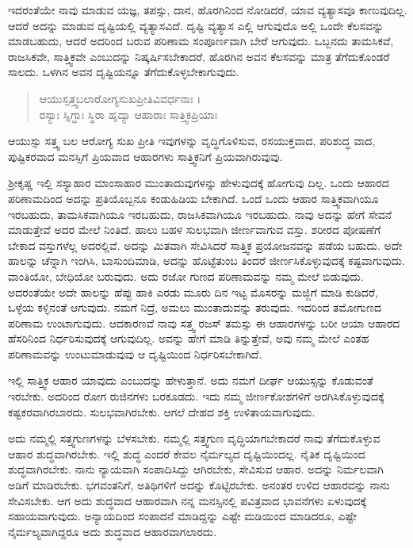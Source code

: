 ಇದರಂತೆಯೇ ನಾವು ಮಾಡುವ ಯಜ್ಞ, ತಪಸ್ಸು, ದಾನ, ಹೊರಗಿನಿಂದ ನೋಡಿದರೆ, ಯಾವ ವ್ಯತ್ಯಾಸವೂ ಕಾಣುವುದಿಲ್ಲ. ಆದರೆ ಅದನ್ನು ಮಾಡುವ ದೃಷ್ಟಿಯಲ್ಲಿ ವ್ಯತ್ಯಾಸವಿದೆ. ದೃಷ್ಟಿ ವ್ಯತ್ಯಾಸ ಎಲ್ಲಿ ಆಗುವುದೊ ಅಲ್ಲಿ ಒಂದೇ ಕೆಲಸವನ್ನು ಮಾಡಬಹುದು, ಆದರೆ ಅದರಿಂದ ಬರುವ ಪರಿಣಾಮ ಸಂಪೂರ್ಣವಾಗಿ ಬೇರೆ ಆಗುವುದು. ಒಬ್ಬನದು ತಾಮಸಿಕವೆ, ರಾಜಸಿಕವೇ, ಸಾತ್ತ್ವಿಕವೇ ಎಂಬುದನ್ನು ನಿಷ್ಕರ್ಷಿಸಬೇಕಾದರೆ, ಹೊರಗಿನ ಅವನ ಕೆಲಸವನ್ನು ಮಾತ್ರ ತೆಗೆದುಕೊಂಡರೆ ಸಾಲದು. ಒಳಗಿನ ಅವನ ದೃಷ್ಟಿಯನ್ನೂ ತೆಗೆದುಕೊಳ್ಳಬೇಕಾಗುವುದು.

\begin{verse}
ಆಯುಸ್ಸತ್ತ್ವಬಲಾರೋಗ್ಯಸುಖಪ್ರೀತಿವಿವರ್ಧನಾಃ ।\\ರಸ್ಯಾಃ ಸ್ನಿಗ್ಧಾಃ ಸ್ಥಿರಾ ಹೃದ್ಯಾ ಆಹಾರಾಃ ಸಾತ್ತ್ವಿಕಪ್ರಿಯಾಃ 
\end{verse}

{\small ಆಯುಸ್ಸು ಸತ್ತ್ವ ಬಲ ಆರೋಗ್ಯ ಸುಖ ಪ್ರೀತಿ ಇವುಗಳನ್ನು ವೃದ್ಧಿಗೊಳಿಸುವ, ರಸಯುಕ್ತವಾದ, ಪರಿಶುದ್ಧ ವಾದ, ಪುಷ್ಟಿಕರವಾದ ಮನಸ್ಸಿಗೆ ಪ್ರಿಯವಾದ ಆಹಾರಗಳು ಸಾತ್ತ್ವಿಕನಿಗೆ ಪ್ರಿಯವಾಗಿರುವುವು.}

ಶ್ರೀಕೃಷ್ಣ ಇಲ್ಲಿ ಸಸ್ಯಾಹಾರ ಮಾಂಸಾಹಾರ ಮುಂತಾದುವುಗಳನ್ನು ಹೇಳುವುದಕ್ಕೆ ಹೋಗುವು ದಿಲ್ಲ. ಒಂದು ಆಹಾರದ ಪರಿಣಾಮದಿಂದ ಅದನ್ನು ಪ್ರತಿಯೊಬ್ಬನೂ ಕಂಡುಹಿಡಿಯ ಬೇಕಾಗಿದೆ. ಒಂದೆ ಒಂದು ಆಹಾರ ಸಾತ್ತ್ವಿಕವಾಗಿಯೂ ಇರಬಹುದು, ತಾಮಸಿಕವಾಗಿಯೂ ಇರಬಹುದು, ರಾಜಸಿಕವಾಗಿಯೂ ಇರಬಹುದು. ನಾವು ಅದನ್ನು ಹೇಗೆ ಸೇವನೆ ಮಾಡುತ್ತೇವೆ ಅದರ ಮೇಲೆ ನಿಂತಿದೆ. ಹಾಲು ಬಹಳ ಸುಲಭವಾಗಿ ಜೀರ್ಣವಾಗುವ ವಸ್ತು. ಶರೀರದ ಪೋಷಣೆಗೆ ಬೇಕಾದ ವಸ್ತುಗಳೆಲ್ಲ ಅದರಲ್ಲಿವೆ. ಅದನ್ನು ಮಿತವಾಗಿ ಸೇವಿಸಿದರೆ ಸಾತ್ತ್ವಿಕ ಪ್ರಯೋಜನವನ್ನು ಪಡೆಯ ಬಹುದು. ಅದೇ ಹಾಲನ್ನು ಚೆನ್ನಾಗಿ ಇಂಗಿಸಿ, ಬಾಸುಂದಿಮಾಡಿ, ಅದನ್ನು ಹೊಟ್ಟೆತುಂಬ ತಿಂದರೆ ಜೀರ್ಣಸಿಕೊಳ್ಳುವುದಕ್ಕೆ ಕಷ್ಟವಾಗುವುದು. ವಾಂತಿಯೋ, ಬೇಧಿಯೋ ಬರುವುದು. ಅದು ರಜೋ ಗುಣದ ಪರಿಣಾಮವನ್ನು ನಮ್ಮ ಮೇಲೆ ಬಿಡುವುದು. ಅದರಂತೆಯೇ ಅದೇ ಹಾಲನ್ನು ಹೆಪ್ಪು ಹಾಕಿ ಎರಡು ಮೂರು ದಿನ ಇಟ್ಟ ಮೊಸರನ್ನು ಮಜ್ಜಿಗೆ ಮಾಡಿ ಕುಡಿದರೆ, ಒಳ್ಳೆಯ ಕಳ್ಳಿನಂತೆ ಆಗುವುದು. ನಮಗೆ ನಿದ್ರೆ, ಅಮಲು ಮುಂತಾದುವನ್ನು ತರುವುದು. ಇದರಿಂದ ತಮೋಗುಣದ ಪರಿಣಾಮ ಉಂಟಾಗುವುದು. ಆದಕಾರಣವೆ ನಾವು ಸತ್ತ್ವ ರಜಸ್ ತಮಸ್ಸು ಈ ಆಹಾರಗಳನ್ನು ಬರೀ ಆಯಾ ಆಹಾರದ ಹೆಸರಿನಿಂದ ನಿರ್ಧರಿಸುವುದಕ್ಕೆ ಆಗುವುದಿಲ್ಲ. ಅವನ್ನು ಹೇಗೆ ಮಾಡಿ ತಿನ್ನುತ್ತೇವೆ, ಅವು ನಮ್ಮ ಮೇಲೆ ಎಂತಹ ಪರಿಣಾಮವನ್ನು ಉಂಟುಮಾಡುವುವು ಆ ದೃಷ್ಟಿಯಿಂದ ನಿರ್ಧರಿಸಬೇಕಾಗಿದೆ.

ಇಲ್ಲಿ ಸಾತ್ತ್ವಿಕ ಆಹಾರ ಯಾವುದು ಎಂಬುದನ್ನು ಹೇಳುತ್ತಾನೆ. ಅದು ನಮಗೆ ದೀರ್ಘ ಆಯುಸ್ಸನ್ನು ಕೊಡುವಂತೆ ಇರಬೇಕು. ಅದರಿಂದ ರೋಗ ರುಜಿನಗಳು ಬರಕೂಡದು. ಇದು ನಮ್ಮ ಜೀರ್ಣಕೋಶಗಳಿಗೆ ಅರಗಿಸಿಕೊಳ್ಳುವುದಕ್ಕೆ ಕಷ್ಟಕರವಾಗಿರಬಾರದು. ಸುಲಭವಾಗಿರಬೇಕು. ಆಗಲೆ ದೇಹದ ಶಕ್ತಿ ಉಳಿತಾಯವಾಗುವುದು.

ಅದು ನಮ್ಮಲ್ಲಿ ಸತ್ತ್ವಗುಣಗಳನ್ನು ಬೆಳಸಬೇಕು. ನಮ್ಮಲ್ಲಿ ಸತ್ತ್ವಗುಣ ವೃದ್ಧಿಯಾಗಬೇಕಾದರೆ ನಾವು ತೆಗೆದುಕೊಳ್ಳುವ ಆಹಾರ ಶುದ್ಧವಾಗಿರಬೇಕು. ಇಲ್ಲಿ ಶುದ್ಧ ಎಂದರೆ ಕೇವಲ ನೈರ್ಮಲ್ಯದ ದೃಷ್ಟಿಯಿಂದಲ್ಲ. ನೈತಿಕ ದೃಷ್ಟಿಯಿಂದ ಶುದ್ಧವಾಗಿರಬೇಕು. ನಾನು ನ್ಯಾಯವಾಗಿ ಸಂಪಾದಿಸಿದ್ದು ಆಗಿರಬೇಕು, ಸೇವಿಸುವ ಆಹಾರ. ಅದನ್ನು ನಿರ್ಮಲವಾಗಿ ಅಡಿಗೆ ಮಾಡಿರಬೇಕು. ಭಗವಂತನಿಗೆ, ಅತಿಥಿಗಳಿಗೆ ಅದನ್ನು ಕೊಟ್ಟಿರಬೇಕು. ಅನಂತರ ಉಳಿದ ಆಹಾರವನ್ನು ನಾನು ಸೇವಿಸಬೇಕು. ಆಗ ಅದು ಶುದ್ಧವಾದ ಆಹಾರವಾಗಿ ನನ್ನ ಮನಸ್ಸಿನಲ್ಲಿ ಪವಿತ್ರವಾದ ಭಾವನೆಗಳು ಏಳುವುದಕ್ಕೆ ಸಹಾಯವಾಗುವುದು. ಅನ್ಯಾಯದಿಂದ ಸಂಪಾದನೆ ಮಾಡಿದ್ದನ್ನು ಎಷ್ಟೇ ಮಡಿಯಿಂದ ಮಾಡಿದರೂ, ಎಷ್ಟೇ ನೈರ್ಮಲ್ಯವಾಗಿದ್ದರೂ ಅದು ಶುದ್ಧವಾದ ಆಹಾರವಾಗಲಾರದು.


